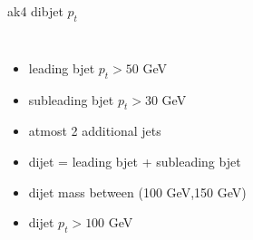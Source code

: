 \documentclass[10pt,xcolor=dvipsnames]{beamer}
\begin{document}
\begin{frame}[fragile]{ak4 dibjet $p_t$}
\begin{columns}
\begin{itemize}
      \item {leading bjet $p_t > 50 $ GeV}
      \item {subleading bjet $p_t > 30 $ GeV}
      \item {atmost 2 additional jets}
      \item {dijet = leading bjet + subleading bjet}
      \item {dijet mass between (100 GeV,150 GeV)}
      \item {dijet $p_t > 100 $ GeV}
    \end{itemize}
  \end{columns}
\end{frame}

\end{document}
